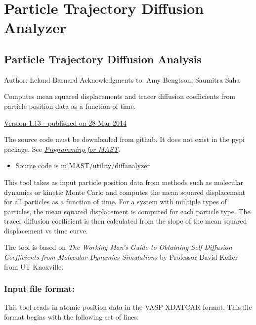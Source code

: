 \documentclass[letterpaper,10pt,english]{sphinxmanual}
\begin{document}
\section{Particle Trajectory Diffusion Analyzer}
\label{8_0_standalonetools:particle-trajectory-diffusion-analyzer}

\subsection{Particle Trajectory Diffusion Analysis}
\label{8_0_3_diffanalyzer:particle-trajectory-diffusion-analysis}\label{8_0_3_diffanalyzer::doc}
Author: Leland Barnard
Acknowledgments to: Amy Bengtson, Saumitra Saha

Computes mean squared displacements and tracer diffusion coefficients from particle position data as a function of time.

\href{https://materialshub.org/resources/diffanalyzer}{Version 1.13 - published on 28 Mar 2014}

The source code must be downloaded from github. It does not exist in the pypi package. See {\hyperref[12_0_programming::doc]{\emph{Programming for MAST}}}.
\begin{itemize}
\item {} 
Source code is in MAST/utility/diffanalyzer

\end{itemize}

This tool takes as input particle position data from methods such as molecular dynamics or kinetic Monte Carlo and computes the mean squared displacement for all particles as a function of time.
For a system with multiple types of particles, the mean squared displacement is computed for each particle type.
The tracer diffusion coefficient is then calculated from the slope of the mean squared displacement vs time curve.

The tool is based on \emph{The Working Man's Guide to Obtaining Self Diffusion Coefficients from Molecular Dynamics Simulations} by Professor David Keffer from UT Knoxville.


\subsubsection{Input file format:}
\label{8_0_3_diffanalyzer:input-file-format}
This tool reads in atomic position data in the VASP XDATCAR format. This file format begins with the following set of lines:
\end{document}
